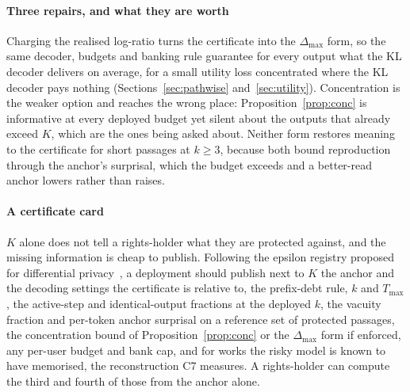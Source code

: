 \paragraph{Three repairs, and what they are worth}
Charging the realised log-ratio turns the certificate into the $\Delta_{\max}$ form, so the same decoder, budgets and banking rule guarantee for every output what the KL decoder delivers on average, for a small utility loss concentrated where the KL decoder pays nothing (Sections~\ref{sec:pathwise} and~\ref{sec:utility}). Concentration is the weaker option and reaches the wrong place: Proposition~\ref{prop:conc} is informative at every deployed budget yet silent about the outputs that already exceed $K$, which are the ones being asked about. Neither form restores meaning to the certificate for short passages at $k \ge 3$, because both bound reproduction through the anchor's surprisal, which the budget exceeds and a better-read anchor lowers rather than raises.

\paragraph{A certificate card}
$K$ alone does not tell a rights-holder what they are protected against, and the missing information is cheap to publish. Following the epsilon registry proposed for differential privacy~\cite{dwork2019expose}, a deployment should publish next to $K$ the anchor and the decoding settings the certificate is relative to, the prefix-debt rule, $k$ and $T_{\max}$, the active-step and identical-output fractions at the deployed $k$, the vacuity fraction and per-token anchor surprisal on a reference set of protected passages, the concentration bound of Proposition~\ref{prop:conc} or the $\Delta_{\max}$ form if enforced, any per-user budget and bank cap, and for works the risky model is known to have memorised, the reconstruction C7 measures. A rights-holder can compute the third and fourth of those from the anchor alone.

